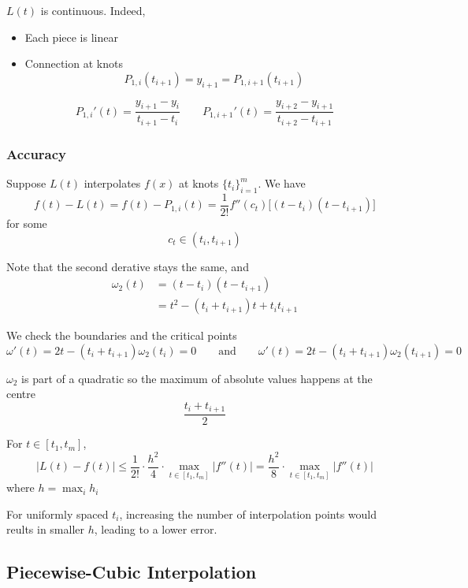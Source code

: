 \begin{remark}
    \( L(t) \) is continuous. Indeed,
    \begin{itemize}
        \item Each piece is linear
        \item Connection at knots \[
                  P_{1,i}(t_{i+1}) = y_{i+1} = P_{1,{i+1}}(t_{i+1})
              \]
    \end{itemize}
\end{remark}

\begin{remark}
    \[
        {P_{1,i}}'(t) = \frac{y_{i+1} - y_i}{t_{i+1} - t_i}
        \qquad
        {P_{1,i+1}}'(t) = \frac{y_{i+2}-y_{i+1}}{t_{i+2}-t_{i+1}}
    \]
\end{remark}

\subsubsection{Accuracy}

Suppose \( L(t) \) interpolates \( f(x) \) at knots \( \{ t_i \}_{i=1}^{m} \).
We have \[
    f(t) - L(t) = f(t) - P_{1,i}(t) = \frac{1}{2!} f''(c_t) \Big[ (t - t_i)(t - t_{i+1}) \Big]
\] for some \[
    c_t \in ( t_i, t_{i+1} )
\]

Note that the second derative stays the same, and \begin{align*}
    \omega_2(t)
     & = (t - t_i)(t - t_{i+1})
    \\
     & = t^2 - (t_i + t_{i+1})t + t_{i}t_{i+1}
\end{align*}

We check the boundaries and the critical points \[
    \omega'(t) = 2t - (t_i+t_{i+1})\omega_2(t_i) = 0
    \qquad \text{and} \qquad
    \omega'(t) = 2t - (t_i+t_{i+1})\omega_2(t_{i+1}) = 0
\]

\( \omega_2 \) is part of a quadratic so the maximum of absolute values happens at the centre \[
    \frac{t_{i} + t_{i+1}}{2}
\]


For \( t \in [t_1, t_m] \), \[
    | L(t) - f(t) | \leq \frac{1}{2!} \cdot \frac{h^2}{4} \cdot \max_{t \in [t_1, t_m]} | f''(t) | = \frac{h^2}{8} \cdot \max_{t \in [t_1, t_m]} | f''(t) |
\] where \( h = \max_{i} h_i \)

For uniformly spaced \( t_i \), increasing the number of interpolation points would reults in smaller \( h \), leading to a lower error.

\subsection{Piecewise-Cubic Interpolation}

